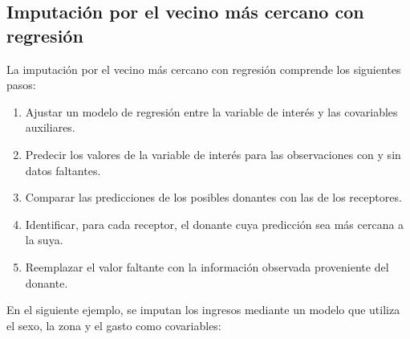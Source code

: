 \documentclass[
  spanish,
  11pt,
  letterpaper,
  oneside,
  open=any]{scrbook}
\newenvironment{Shaded}{\begin{snugshade}}{\end{snugshade}}
\newcommand{\AttributeTok}[1]{\textcolor[rgb]{0.40,0.45,0.13}{#1}}
\newcommand{\FunctionTok}[1]{\textcolor[rgb]{0.28,0.35,0.67}{#1}}
\newcommand{\NormalTok}[1]{\textcolor[rgb]{0.00,0.23,0.31}{#1}}
\newcommand{\OtherTok}[1]{\textcolor[rgb]{0.00,0.23,0.31}{#1}}
\newcommand{\SpecialCharTok}[1]{\textcolor[rgb]{0.37,0.37,0.37}{#1}}
\providecommand{\tightlist}{%
  \setlength{\itemsep}{0pt}\setlength{\parskip}{0pt}}
\begin{document}
\subsection{Imputación por el vecino más cercano con
regresión}\label{imputaciuxf3n-por-el-vecino-muxe1s-cercano-con-regresiuxf3n}

La imputación por el vecino más cercano con regresión comprende los
siguientes pasos:

\begin{enumerate}
\def\labelenumi{\arabic{enumi}.}
\tightlist
\item
  Ajustar un modelo de regresión entre la variable de interés y las
  covariables auxiliares.
\item
  Predecir los valores de la variable de interés para las observaciones
  con y sin datos faltantes.
\item
  Comparar las predicciones de los posibles donantes con las de los
  receptores.
\item
  Identificar, para cada receptor, el donante cuya predicción sea más
  cercana a la suya.
\item
  Reemplazar el valor faltante con la información observada proveniente
  del donante.
\end{enumerate}

En el siguiente ejemplo, se imputan los ingresos mediante un modelo que
utiliza el sexo, la zona y el gasto como covariables:

\begin{Shaded}
\end{Shaded}
\end{document}
